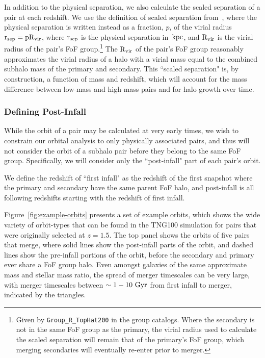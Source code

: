 \documentclass[twocolumn,linenumbers]{aastex631}
\begin{document}
In addition to the physical separation, we also calculate the scaled separation of a pair at each redshift. We use the definition of scaled separation from~\cite{Chamberlain2024}, where the physical separation is written instead as a fraction, $p$, of the virial radius $\rm r_{sep}=p\rm R_{vir}$, where $\rm r_{sep}$ is the physical separation in $\mathrm{\,kpc}$, and $\rm R_{vir}$ is the virial radius of the pair's FoF group.\footnote{Given by \texttt{Group\_R\_TopHat200} in the group catalogs. Where the secondary is not in the same FoF group as the primary, the virial radius used to calculate the scaled separation will remain that of the primary's FoF group, which merging secondaries will eventually re-enter prior to merger.} 
The $\rm R_{vir}$ of the pair's FoF group reasonably approximates the virial radius of a halo with a virial mass equal to the combined subhalo mass of the primary and secondary.
This ``scaled separation" is, by construction, a function of mass and redshift, which will account for the mass difference between low-mass and high-mass pairs and for halo growth over time. 


\subsubsection{Defining Post-Infall}
While the orbit of a pair may be calculated at very early times, we wish to constrain our orbital analysis to only physically associated pairs, and thus will not consider the orbit of a subhalo pair before they belong to the same FoF group. 
Specifically, we will consider only the ``post-infall" part of each pair's orbit. 

We define the redshift of ``first infall" as the redshift of the first snapshot where the primary and secondary have the same parent FoF halo, and post-infall is all following redshifts starting with the redshift of first infall. 

Figure~\ref{fig:example-orbits} presents a set of example orbits, which shows the wide variety of orbit-types that can be found in the TNG100 simulation for pairs that were originally selected at $z=1.5$. 
The top panel shows the orbits of five pairs that merge, where solid lines show the post-infall parts of the orbit, and dashed lines show the pre-infall portions of the orbit, before the secondary and primary ever share a FoF group halo. 
Even amongst galaxies of the same approximate mass and stellar mass ratio, the spread of merger timescales can be very large, with merger timescales between $\sim1-10\,\mathrm{\,Gyr}$ from first infall to merger,  indicated by the triangles. 
\end{document}
